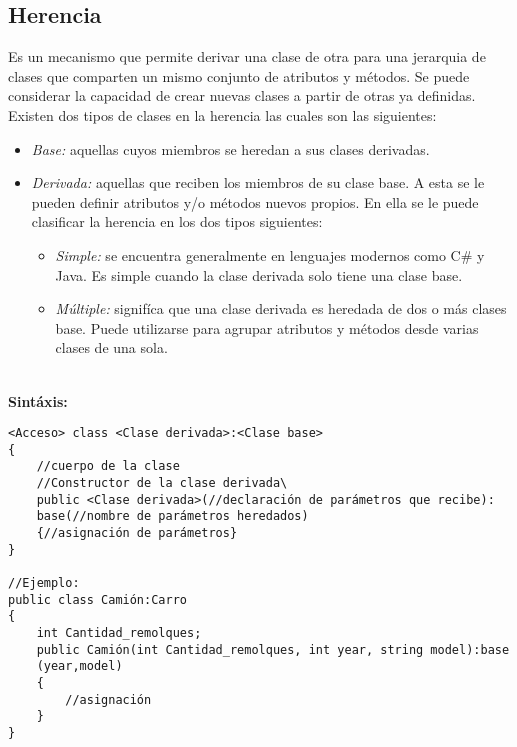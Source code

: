 \documentclass[letterpaper, 12pt]{article}
\begin{document}
\begin{justify}
        \subsection{Herencia}
        Es un mecanismo que permite derivar una clase de otra para una jerarquia de clases que comparten un mismo conjunto de atributos y métodos. Se puede considerar
        la capacidad de crear nuevas clases a partir de otras ya definidas. Existen dos tipos de clases en la herencia las cuales son las siguientes:
        \begin{itemize}
            \item \emph{Base:} aquellas cuyos miembros se heredan a sus clases derivadas.
            \item \emph{Derivada:} aquellas que reciben los miembros de su clase base. A esta se le pueden definir atributos y/o métodos nuevos propios. En ella se le puede clasificar 
            la herencia en los dos tipos siguientes:
            \begin{itemize}
                \item \emph{Simple:} se encuentra generalmente en lenguajes modernos como C\# y Java. Es simple cuando la clase derivada solo tiene una clase base.
                \item \emph{Múltiple:} signifíca que una clase derivada es heredada de dos o más clases base. Puede utilizarse para agrupar atributos y métodos desde varias clases de una sola.
            \end{itemize}
        \end{itemize}
        \textbf{\\Sintáxis:}
            \begin{verbatim}
<Acceso> class <Clase derivada>:<Clase base>
{
    //cuerpo de la clase
    //Constructor de la clase derivada\
    public <Clase derivada>(//declaración de parámetros que recibe):
    base(//nombre de parámetros heredados)
    {//asignación de parámetros}
}

//Ejemplo:
public class Camión:Carro
{
    int Cantidad_remolques;
    public Camión(int Cantidad_remolques, int year, string model):base
    (year,model)
    {
        //asignación
    }
}
            \end{verbatim}

\end{justify}
\end{document}
